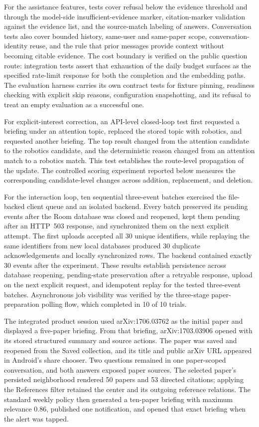 For the assistance features, tests cover refusal below the evidence threshold
and through the model-side insufficient-evidence marker, citation-marker
validation against the evidence list, and the source-match labeling of answers.
Conversation tests also cover bounded history, same-user and same-paper scope,
conversation-identity reuse, and the rule that prior messages provide context
without becoming citable evidence.
The cost boundary is verified on the public question route: integration tests assert that exhaustion of the daily budget surfaces as the specified rate-limit response for both the completion and the embedding paths.
The evaluation harness carries its own contract tests for fixture pinning, readiness checking with explicit skip reasons, configuration snapshotting, and its refusal to treat an empty evaluation as a successful one.

For explicit-interest correction, an API-level closed-loop test first requested a briefing under an attention topic, replaced the stored topic with robotics, and requested another briefing. The top result changed from the attention candidate to the robotics candidate, and the deterministic reason changed from an attention match to a robotics match. This test establishes the route-level propagation of the update. The controlled scoring experiment reported below measures the corresponding candidate-level changes across addition, replacement, and deletion.

For the interaction loop, ten sequential three-event batches exercised the
file-backed client queue and an isolated backend. Every batch preserved its
pending events after the Room database was closed and reopened, kept them
pending after an HTTP~503 response, and synchronized them on the next explicit
attempt. The first uploads accepted all 30 unique identifiers, while replaying
the same identifiers from new local databases produced 30 duplicate
acknowledgements and locally synchronized rows. The backend contained exactly
30 events after the experiment. These results establish persistence across
database reopening, pending-state preservation after a retryable response,
upload on the next explicit request, and idempotent replay for the tested
three-event batches.
Asynchronous job visibility was verified by the three-stage paper-preparation polling flow, which completed in 10 of 10 trials.

The integrated product session used arXiv:1706.03762 as the initial paper
and displayed a five-paper briefing. From that briefing, arXiv:1703.03906 opened
with its stored structured summary and source actions. The paper was saved and
reopened from the Saved collection, and its title and public arXiv URL appeared
in Android's share chooser. Two questions remained in one paper-scoped
conversation, and both answers exposed paper sources. The selected paper's
persisted neighborhood rendered 50 papers and 53 directed citations; applying
the References filter retained the center and its outgoing reference relations.
The standard weekly policy then generated a ten-paper briefing with maximum
relevance 0.86, published one notification, and opened that exact briefing when
the alert was tapped.

